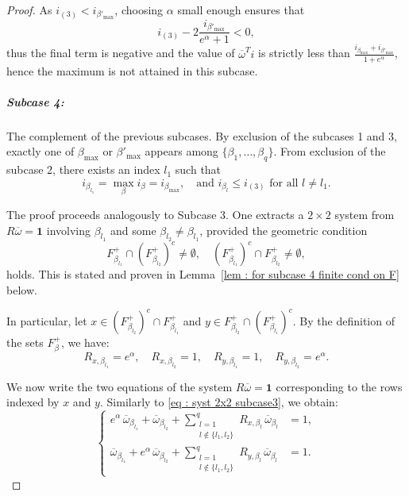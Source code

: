 \documentclass[a4paper, 11pt]{article}
\theoremstyle{definition}
\begin{document}
{\begin{proof}
As $i_{(3)} < i_{\beta'_{\max}}$, choosing $\alpha$ small enough ensures that 
\[
i_{(3)} - 2 \frac{i_{\beta'_{\max}}}{e^\alpha + 1} < 0,
\]
thus the final term is negative and the value of $\overline{\omega}^T i$ is strictly less than $\frac{i_{\beta_{\max}} + i_{\beta'_{\max}}}{1 + e^\alpha}$, hence the maximum is not attained in this subcase.

\subparagraph{Subcase 4:} The complement of the previous subcases.  
By exclusion of the subcases 1 and 3, exactly one of $\beta_{\max}$ or $\beta'_{\max}$ appears among $\{\beta_1, \dots, \beta_q\}$.
From exclusion of the subcase 2, there exists an index $l_1$ such that
\[
i_{\beta_{l_1}} = \max_{\beta} i_\beta = i_{\beta_{\max}}, \quad \text{and } i_{\beta_l} \le i_{(3)} \text{ for all } l \neq l_1.
\]

The proof proceeds analogously to Subcase 3. One extracts a $2 \times 2$ system from $R \overline{\omega} = \bm{1}$ involving $\beta_{l_1}$ and some $\beta_{l_2} \neq \beta_{l_1}$, provided the geometric condition
\begin{equation} \label{eq : subcase 4 finite cond on F}
F^+_{\beta_{l_1}} \cap \left(F^+_{\beta_{l_2}}\right)^c \neq \emptyset, \quad 
\left(F^+_{\beta_{l_1}}\right)^c \cap F^+_{\beta_{l_2}} \neq \emptyset,
\end{equation}
holds. This is stated and proven in Lemma~\ref{lem : for subcase 4 finite cond on F} below.


In particular, let $x \in \left( F^{+}_{\beta_{l_2}} \right)^c \cap F^+_{\beta_{l_1}}$ and $y \in F^+_{\beta_{l_2}} \cap \left( F^{+}_{\beta_{l_1}} \right)^c$.  
By the definition of the sets $F^+_\beta$, we have:
\[
R_{x,\beta_{l_1}} = e^\alpha, \quad R_{x,\beta_{l_2}} = 1, \quad R_{y,\beta_{l_1}} = 1, \quad R_{y,\beta_{l_2}} = e^\alpha.
\]

We now write the two equations of the system $R\overline{\omega} = \bm{1}$ corresponding to the rows indexed by $x$ and $y$. Similarly to \eqref{eq : syst 2x2 subcase3}, we obtain:
\begin{equation*}
\left\{
\begin{aligned}
e^\alpha \, \overline{\omega}_{\beta_{l_1}} + \overline{\omega}_{\beta_{l_2}} 
+ \sum_{\substack{l=1 \\ l \notin \{l_1,l_2\}}}^q R_{x,\beta_l} \, \overline{\omega}_{\beta_l} &= 1, \\
\overline{\omega}_{\beta_{l_1}} + e^\alpha \, \overline{\omega}_{\beta_{l_2}} 
+ \sum_{\substack{l=1 \\ l \notin \{l_1,l_2\}}}^q R_{y,\beta_l} \, \overline{\omega}_{\beta_l} &= 1.
\end{aligned}
\right.
\end{equation*}


\end{proof}}
\end{document}
